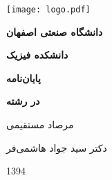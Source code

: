 \newpage
\thispagestyle{empty}
\centering
\noindent
\thispagestyle{empty}
\noindent
\vspace{-1cm}\centerline{{\texttt{[image: logo.pdf]}}}


\centerline{\large{\bfseries{ دانشگاه صنعتی اصفهان}}}
\vspace{3pt}
\centerline{\large{\bfseries{دانشکده فیزیک}}}
\vskip 1cm
\large{\bfseries{پایان‌نامه}}

{\large{\bfseries{}}}
{\large\bfseries{در رشته}}
\vskip 1cm


\centerline{\Large \bfseries\onvan}



{\Huge{}}\par


\vskip 1cm
{\large%
  \by}\par
  \vskip 0.5cm
\par
{\nastaliq\Large{مرصاد مستقیمی}\par}
\vskip 1cm
{\large
  \undersupervision\par
\nastaliq \Large{دکتر سید جواد هاشمی‌فر}}
\vskip 1cm
{\large
  \coadvisor\par
{}}
\vskip 1cm
\vskip 8mm
\par
{\large{1394}
\par
\vskip 1cm

\par
}
\vfill